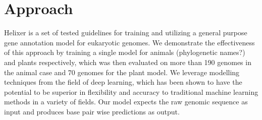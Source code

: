 \documentclass{bioinfo}
\begin{document}
\section{Approach}
Helixer is a set of tested guidelines for training and utilizing a general purpose gene annotation model for eukaryotic genomes. We demonstrate the effectiveness of this approach by training a single model for animals (phylogenetic names?) and plants respectively, which was then evaluated on more than 190 genomes in the animal case and 70 genomes for the plant model. We leverage modelling techniques from the field of deep learning, which has been shown to have the potential to be superior in flexibility and accuracy to traditional machine learning methods in a variety of fields. Our model expects the raw genomic sequence as input and produces base pair wise predictions as output.
\end{document}
